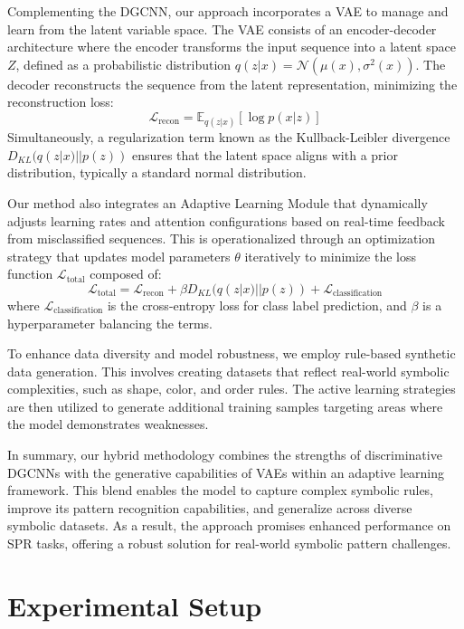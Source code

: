 \documentclass{article}
\begin{document}
Complementing the DGCNN, our approach incorporates a VAE to manage and learn from the latent variable space. The VAE consists of an encoder-decoder architecture where the encoder transforms the input sequence into a latent space \( Z \), defined as a probabilistic distribution \( q(z|x) = \mathcal{N}(\mu(x), \sigma^2(x)) \). The decoder reconstructs the sequence from the latent representation, minimizing the reconstruction loss:
\[
\mathcal{L}_{\text{recon}} = \mathbb{E}_{q(z|x)}[\log p(x|z)]
\]
Simultaneously, a regularization term known as the Kullback-Leibler divergence \( D_{KL}(q(z|x) || p(z)) \) ensures that the latent space aligns with a prior distribution, typically a standard normal distribution.

Our method also integrates an Adaptive Learning Module that dynamically adjusts learning rates and attention configurations based on real-time feedback from misclassified sequences. This is operationalized through an optimization strategy that updates model parameters \( \theta \) iteratively to minimize the loss function \( \mathcal{L}_{\text{total}} \) composed of:
\[
\mathcal{L}_{\text{total}} = \mathcal{L}_{\text{recon}} + \beta D_{KL}(q(z|x) || p(z)) + \mathcal{L}_{\text{classification}}
\]
where \( \mathcal{L}_{\text{classification}} \) is the cross-entropy loss for class label prediction, and \( \beta \) is a hyperparameter balancing the terms.

To enhance data diversity and model robustness, we employ rule-based synthetic data generation. This involves creating datasets that reflect real-world symbolic complexities, such as shape, color, and order rules. The active learning strategies are then utilized to generate additional training samples targeting areas where the model demonstrates weaknesses.

In summary, our hybrid methodology combines the strengths of discriminative DGCNNs with the generative capabilities of VAEs within an adaptive learning framework. This blend enables the model to capture complex symbolic rules, improve its pattern recognition capabilities, and generalize across diverse symbolic datasets. As a result, the approach promises enhanced performance on SPR tasks, offering a robust solution for real-world symbolic pattern challenges.

\section{Experimental Setup}
\end{document}
